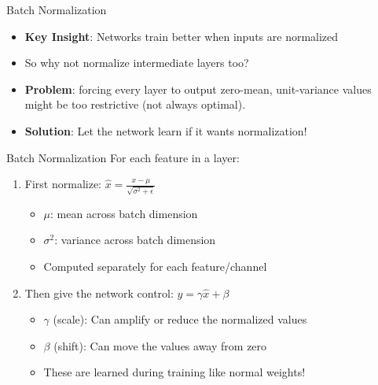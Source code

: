 \begin{frame}{Batch Normalization}
    \begin{itemize}
        \item \textbf{Key Insight}: Networks train better when inputs are normalized
        \item So why not normalize intermediate layers too?
        \item \textbf{Problem}: forcing every layer to output zero-mean, unit-variance values might be too restrictive (not always optimal).
        \item \textbf{Solution}: Let the network learn if it wants normalization!
    \end{itemize}
\end{frame}

\begin{frame}{Batch Normalization}
    For each feature in a layer:
    \begin{enumerate}
        \item First normalize: $\hat{x} = \frac{x - \mu}{\sqrt{\sigma^2 + \epsilon}}$
        \begin{itemize}
            \item $\mu$: mean across batch dimension
            \item $\sigma^2$: variance across batch dimension
            \item Computed separately for each feature/channel
        \end{itemize}
        \vspace{0.5em}
        \item Then give the network control:
        $y = \gamma\hat{x} + \beta$
        \begin{itemize}
            \item $\gamma$ (scale): Can amplify or reduce the normalized values
            \item $\beta$ (shift): Can move the values away from zero
            \item These are learned during training like normal weights!
        \end{itemize}
        
    \end{enumerate}
\end{frame}

